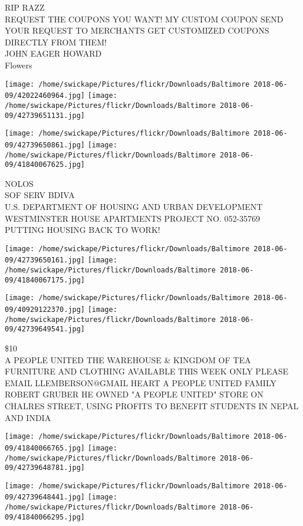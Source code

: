 \documentclass[10pt,letterpaper]{article}
\begin{document}
RIP RAZZ\\
REQUEST THE COUPONS YOU WANT!  MY CUSTOM COUPON SEND YOUR REQUEST TO MERCHANTS GET CUSTOMIZED COUPONS DIRECTLY FROM THEM!\\
JOHN EAGER HOWARD\\
Flowers
\pagebreak

\texttt{[image: /home/swickape/Pictures/flickr/Downloads/Baltimore 2018-06-09/42022460964.jpg]}
\texttt{[image: /home/swickape/Pictures/flickr/Downloads/Baltimore 2018-06-09/42739651131.jpg]}

\texttt{[image: /home/swickape/Pictures/flickr/Downloads/Baltimore 2018-06-09/42739650861.jpg]}
\texttt{[image: /home/swickape/Pictures/flickr/Downloads/Baltimore 2018-06-09/41840067625.jpg]}

NOLOS\\
SOF SERV BDIVA\\
U.S. DEPARTMENT OF HOUSING AND URBAN DEVELOPMENT WESTMINSTER HOUSE APARTMENTS PROJECT NO. 052{-}35769\\
PUTTING HOUSING BACK TO WORK!
\pagebreak

\texttt{[image: /home/swickape/Pictures/flickr/Downloads/Baltimore 2018-06-09/42739650161.jpg]}
\texttt{[image: /home/swickape/Pictures/flickr/Downloads/Baltimore 2018-06-09/41840067175.jpg]}

\texttt{[image: /home/swickape/Pictures/flickr/Downloads/Baltimore 2018-06-09/40929122370.jpg]}
\texttt{[image: /home/swickape/Pictures/flickr/Downloads/Baltimore 2018-06-09/42739649541.jpg]}

\$10\\
A PEOPLE UNITED THE WAREHOUSE \& KINGDOM OF TEA\\
FURNITURE AND CLOTHING AVAILABLE THIS WEEK ONLY PLEASE EMAIL LLEMBERSON@GMAIL HEART A PEOPLE UNITED FAMILY\\
ROBERT GRUBER HE OWNED "A PEOPLE UNITED" STORE ON CHALRES STREET, USING PROFITS TO BENEFIT STUDENTS IN NEPAL AND INDIA
\pagebreak

\texttt{[image: /home/swickape/Pictures/flickr/Downloads/Baltimore 2018-06-09/41840066765.jpg]}
\texttt{[image: /home/swickape/Pictures/flickr/Downloads/Baltimore 2018-06-09/42739648781.jpg]}

\texttt{[image: /home/swickape/Pictures/flickr/Downloads/Baltimore 2018-06-09/42739648441.jpg]}
\texttt{[image: /home/swickape/Pictures/flickr/Downloads/Baltimore 2018-06-09/41840066295.jpg]}
\end{document}
